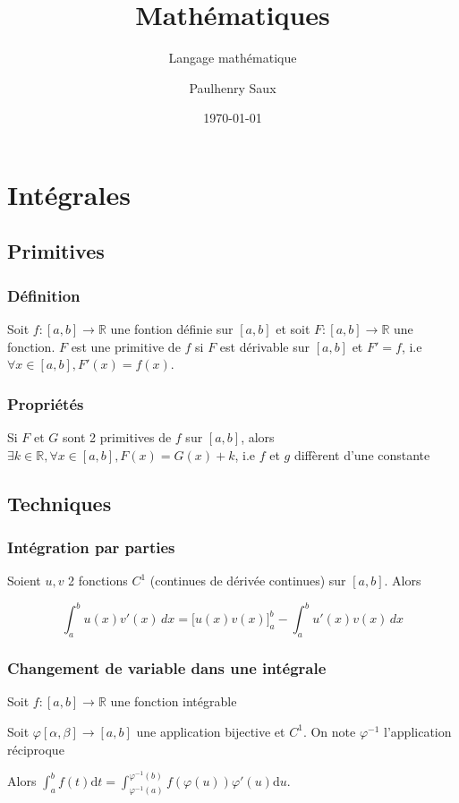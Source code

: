 \documentclass[french]{yLectureNote}
\title{Mathématiques}
\subtitle{Langage mathématique}
\author{Paulhenry Saux}
\date{\today}
\begin{document}
\setcounter{chapter}{3}

	\chapter{Intégrales}
\section{Primitives}

\subsection{Définition}
Soit $f: [a,b] \to \mathbb{R}$ une fontion définie sur $[a,b]$ et soit $F : [a,b] \to \mathbb{R}$ une fonction. $F$ est une primitive de $f$ si $F$ est dérivable sur $[a,b]$ et $F' = f$, i.e $\forall x\in[a,b], F'(x) = f(x)$.

\subsection{Propriétés}
Si $F$ et $G$ sont 2 primitives de $f$ sur $[a,b]$, alors $\exists k\in\mathbb{R},\forall x\in[a,b],F(x) = G(x)+k$, i.e $f$ et $g$ diffèrent d'une constante
\section{Techniques}
\subsection{Intégration par parties}
Soient $u,v$ 2 fonctions $C^1$ (continues de dérivée continues) sur $[a,b]$. Alors
\begin{theorem}[Formule]
\[\int_a^b u(x) v'(x) \, dx  = \Big[u(x) v(x)\Big]_a^b - \int_a^b u'(x) v(x) \, dx\]
\end{theorem}
\subsection{Changement de variable dans une intégrale}
\begin{theorem}[]
Soit $f : [a,b]\to \mathbb{R}$ une fonction intégrable

Soit $\varphi [\alpha,\beta] \to [a,b]$ une application bijective et $C^1$. On note $\varphi^{-1}$ l'application réciproque

Alors $\int^b_a f(t)\mathrm{d}t = \int^{\varphi^{-1}(b)}_{\varphi^{-1}(a)} f(\varphi(u))\varphi'(u)\mathrm{d}u$.
\end{theorem}
\end{document}
